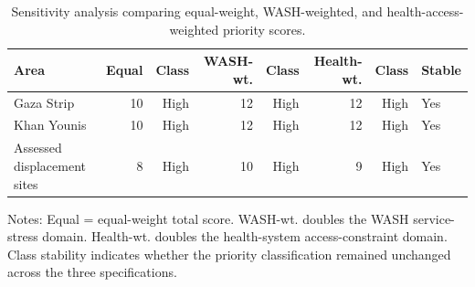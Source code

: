 \begin{table}[htbp]
\centering
\caption{Sensitivity analysis comparing equal-weight, WASH-weighted, and health-access-weighted priority scores.}
\label{tab:sensitivity_analysis}
\begin{tabular}{lrrrrrrl}
\toprule
Area & Equal & Class & WASH-wt. & Class & Health-wt. & Class & Stable \\
\midrule
Gaza Strip & 10 & High & 12 & High & 12 & High & Yes \\
Khan Younis & 10 & High & 12 & High & 12 & High & Yes \\
Assessed displacement sites & 8 & High & 10 & High & 9 & High & Yes \\
\bottomrule
\end{tabular}
\begin{flushleft}
\footnotesize Notes: Equal = equal-weight total score. WASH-wt. doubles the WASH service-stress domain. Health-wt. doubles the health-system access-constraint domain. Class stability indicates whether the priority classification remained unchanged across the three specifications.
\end{flushleft}
\end{table}
